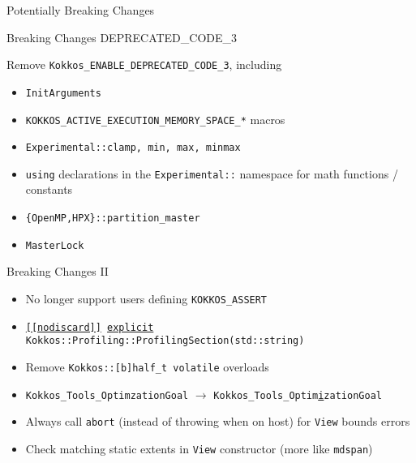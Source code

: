 
\begin{frame}[fragile]

  {\Huge Potentially Breaking Changes}
  
    \vspace{10pt}

\end{frame}




\begin{frame}[fragile]{Breaking Changes DEPRECATED\_CODE\_3}

Remove  \texttt{Kokkos\_ENABLE\_DEPRECATED\_CODE\_3}, including

\begin{itemize}
\item \texttt{InitArguments}
\item \texttt{KOKKOS\_ACTIVE\_EXECUTION\_MEMORY\_SPACE\_*} macros
\item \texttt{Experimental::{clamp, min, max, minmax}}
\item \texttt{using} declarations in the \texttt{Experimental::} namespace for math functions / constants
\item \texttt{\{OpenMP,HPX\}::partition\_master}
\item \texttt{MasterLock}
\end{itemize}


\end{frame}


\begin{frame}[fragile]{Breaking Changes II}

\begin{itemize}
\item No longer support users defining \texttt{KOKKOS\_ASSERT}
\item \texttt{\underline{[[nodiscard]]} \underline{explicit} Kokkos::Profiling::ProfilingSection(std::string)}
\item Remove \texttt{Kokkos::[b]half\_t volatile} overloads
\item \texttt{Kokkos\_Tools\_OptimzationGoal} $\rightarrow$ \texttt{Kokkos\_Tools\_Optim\underline{i}zationGoal}
\item Always call \texttt{abort} (instead of throwing when on host) for \texttt{View} bounds errors
\item Check matching static extents in \texttt{View} constructor (more like \texttt{mdspan})
\end{itemize}


\end{frame}

